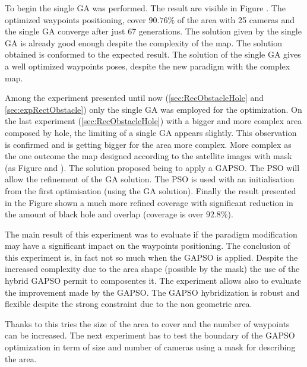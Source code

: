 To begin the single GA was performed. The result are visible in Figure . The optimized waypoints positioning, cover $90.76\%$ of the area with 25 cameras and the single GA converge after just 67 generations. The solution given by the single GA is already good enough despite the complexity of the map. 
  The solution obtained is conformed to the expected result. The solution of the single GA gives a well optimized waypoints poses, despite the new paradigm with the complex map. 
  
   Among the experiment presented until now (\ref{sec:RecObstacleHole} and \ref{sec:expRectObstacle}) only the single GA was employed for the optimization. On the last experiment (\ref{sec:RecObstacleHole}) with a bigger and more complex area composed by hole,  the limiting of a single GA appears slightly. This observation is confirmed and is getting bigger for the area more complex. More complex as the one outcome the map designed according to the satellite images with mask (as  Figure  and ).
The solution proposed being to apply a GAPSO. The PSO will allow the refinement of the GA solution.
The PSO is used with an initialisation from the first optimisation (using  the GA solution). 
Finally the result presented in the Figure  shown a much more refined  coverage with significant reduction in the amount of black hole and overlap (coverage is over $92.8\%$). 

The main result of this experiment was to evaluate if the paradigm modification may have a significant impact on the waypoints positioning.
 The conclusion of this experiment is, in fact not so much when the GAPSO is applied. Despite the increased complexity due to the area shape (possible by the mask) the use of the hybrid GAPSO permit to composentes it. The experiment allows also to evaluate the improvement made by the GAPSO. The GAPSO hybridization is robust and flexible despite the strong constraint due to the non geometric area.  

Thanks to this tries the size of the area to cover and the number of waypoints can be increased. The next experiment has to test the boundary of the GAPSO optimization in term of size and number of cameras using a mask for describing the area.


